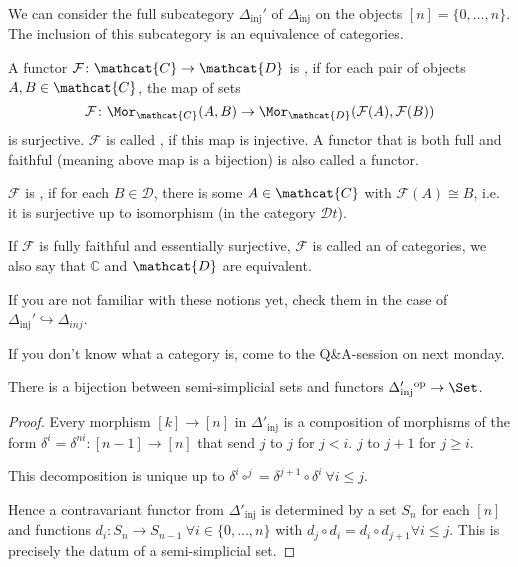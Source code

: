 \begin{remark}\label{rm:delta-inj-prime-full-subcategory}
    We can consider the full subcategory $\Delta_\text{inj}'$ of $\Delta_\text{inj}$ on the objects $[n] = \{0,\ldots,n\}$. The inclusion of this subcategory is an equivalence of categories.
\end{remark}

\begin{recap}
    A functor $\mathcal{F}\colon  \mathcat{C}\to \mathcat{D}$ is , if for each pair of objects $A,B \in \mathcat{C}$, the map of sets
    \[
        \mathcal{F}\colon \Mor_{\mathcat{C}}(A,B) \to  \Mor_{\mathcat{D}}(\mathcal{F}(A),\mathcal{F}(B))
    \] 
    is surjective. $\mathcal{F}$ is called , if this map is injective. A functor that is both full and faithful (meaning above map is a bijection) is also called a  functor. 

    $\mathcal{F}$ is , if for each $B\in \mathcal{D}$, there is some $A\in \mathcat{C}$ with $\mathcal{F}(A) \cong B$, i.e. it is surjective up to isomorphism (in the category $\mathcal{D}t$).

    If $\mathcal{F}$ is fully faithful and essentially surjective, $\mathcal{F}$ is called an  of categories, we also say that $\mathbb{C}$ and $\mathcat{D}$ are equivalent.

    If you are not familiar with these notions yet, check them in the case of $\Delta_{\text{inj}}'\hookrightarrow \Delta_{inj}$.
\end{recap}

\begin{orga}
    If you don't know what a category is, come to the Q\&A-session on next monday.
\end{orga}

\begin{lemma}\label{lm:semi-simplicial-sets-are-equivalent-to-functors-from-delta-inj-prime-to-set}
    There is a bijection between semi-simplicial sets and functors  $\Delta'_{\text{inj}}{}^\text{op} \to  \Set$.
\end{lemma}
\begin{proof} %
    Every morphism $[k] \to  [n]$ in $\Delta'_\text{inj}$ is a composition of morphisms
    of the form $\delta^i = \delta^{ni}: [n-1] \to  [n]$ that send
    $j$ to $j$ for $j < i$.
    $j$ to $j+1$ for $j \ge i$.
    
    This decomposition is unique up to $\delta^i \circ^j = \delta^{j+1} \circ \delta^i ~ \forall i \le j$.



    Hence a contravariant functor from $\Delta'_\text{inj}$ is determined by a set $S_n$ for each $[n]$ and functions $d_i: S_n \to S_{n-1} ~ \forall i \in  \{0,\ldots,n\}$ 
    with $d_j \circ d_i = d_i \circ d_{j+1} \forall i \le j$.
    This is precisely the datum of a semi-simplicial set.
\end{proof}

